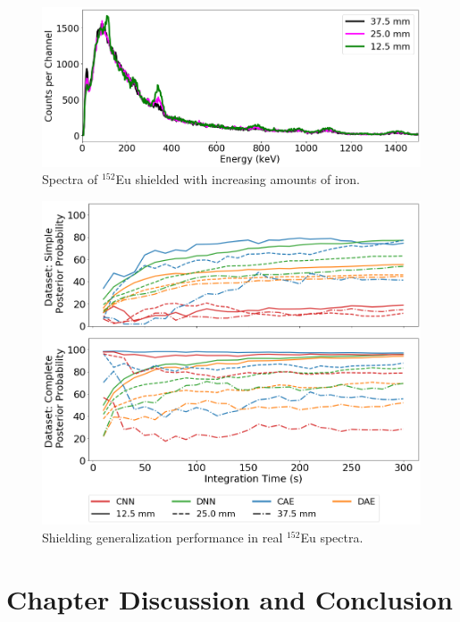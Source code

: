 \begin{figure}[H]
	\centering
	\includegraphics[width=1.0\linewidth]{images/shielded_eu152}
	\caption{Spectra of $^{152}$Eu shielded with increasing amounts of iron.}
	\label{fig:shielded_eu152}
\end{figure}


\begin{figure}[H]
	\centering
	\includegraphics[width=0.9\linewidth]{images/iron_eu152}	\caption{Shielding generalization performance in real $^{152}$Eu spectra.}
	\label{fig:iron_eu152}
\end{figure}

\section{Chapter Discussion and Conclusion}

